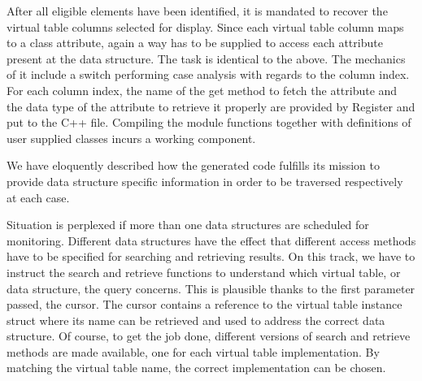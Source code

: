 \documentclass[pdftex, 11pt, a4paper]{report}
\begin{document}
\par
After all eligible elements have been identified, it is mandated to recover the virtual table columns selected for display. Since each virtual table column maps to a class attribute, again a way has to be supplied to access each attribute present at the data structure. The task is identical to the above. The mechanics of it include a switch performing case analysis with regards to the column index. For each column index, the name of the get method to fetch the attribute and the data type of the attribute to retrieve it properly are provided by Register and put to the C++ file. Compiling the module functions together with definitions of user supplied classes incurs a working component.
\par
We have eloquently described how the generated code fulfills its mission to provide data structure specific information in order to be traversed respectively at each case. 
\par
Situation is perplexed if more than one data structures are scheduled for monitoring. Different data structures have the effect that different access methods have to be specified for searching and retrieving results. On this track, we have to instruct the search and retrieve functions to understand which virtual table, or data structure, the query concerns. This is plausible thanks to the first parameter passed, the cursor. The cursor contains a reference to the virtual table instance struct where its name can be retrieved and used to address the correct data structure. Of course, to get the job done, different versions of search and retrieve methods are made available, one for each virtual table implementation. By matching the virtual table name, the correct implementation can be chosen.
\par
\end{document}
